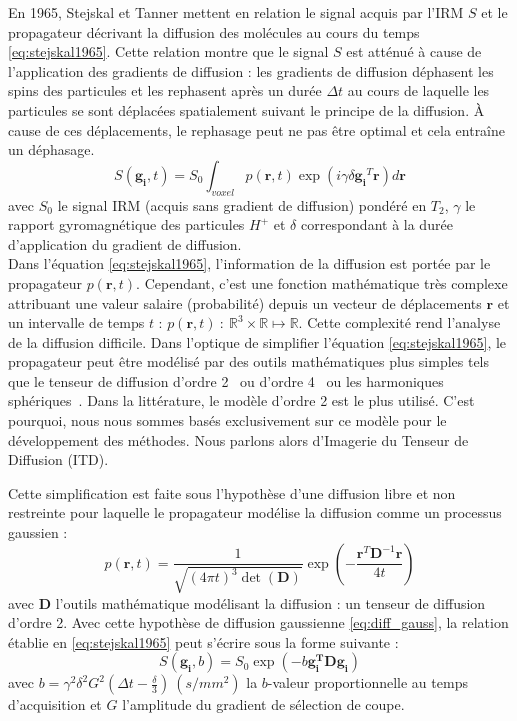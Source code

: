 En 1965, Stejskal et Tanner \cite{Stejskal1965} mettent en relation le signal acquis par l'IRM $S$
et le propagateur décrivant la diffusion des molécules au cours du temps \eqref{eq:stejskal1965}.
Cette relation montre que le signal $S$ est atténué à cause de l'application des gradients de diffusion : 
les gradients de diffusion déphasent les spins des particules et les rephasent après un durée $\Delta t$ 
au cours de laquelle les particules se sont déplacées spatialement suivant le principe de la diffusion.
À cause de ces déplacements, le rephasage peut ne pas être optimal et cela entraîne un déphasage.
\begin{equation}
    S(\mathbf{g_i},t) = S_0 \int_{voxel} p(\mathbf{r},t)\exp(i\gamma\delta\mathbf{g_i}^T\mathbf{r})d\mathbf{r}
    \label{eq:stejskal1965}
\end{equation}
\noindent avec $S_0$ le signal IRM (acquis sans gradient de diffusion) pondéré en $T_2$, $\gamma$ le rapport gyromagnétique des particules $H^+$ 
et $\delta$ correspondant à la durée d'application du gradient de diffusion.\\

Dans l'équation \eqref{eq:stejskal1965}, l'information de la diffusion est portée par le propagateur $p(\mathbf{r},t)$.
Cependant, c'est une fonction mathématique très complexe attribuant une valeur salaire (probabilité)
depuis un vecteur de déplacements $\mathbf{r}$ et un intervalle de temps $t$ : $p(\mathbf{r},t)\ :\ \mathbb{R}^3\times\mathbb{R} \mapsto \mathbb{R}$.
Cette complexité rend l'analyse de la diffusion difficile.
Dans l'optique de simplifier l'équation \eqref{eq:stejskal1965}, le propagateur peut être modélisé par des outils mathématiques plus simples
tels que le tenseur de diffusion d'ordre 2~\cite{Basser1994} ou d'ordre 4~\cite{Barmpoutis2009} ou les harmoniques sphériques~\cite{Descoteaux2007}.
Dans la littérature, le modèle d'ordre 2 est le plus utilisé.
C'est pourquoi, nous nous sommes basés exclusivement sur ce modèle pour le développement des méthodes.
Nous parlons alors d'Imagerie du Tenseur de Diffusion (ITD).

Cette simplification est faite sous l'hypothèse d'une diffusion libre et non restreinte pour laquelle
le propagateur modélise la diffusion comme un processus gaussien :
\begin{equation}
   p(\mathbf{r}, t) = \frac{1}{\sqrt{(4\pi t)^3 \det(\mathbf{D})}} \exp\left(-\frac{\mathbf{r}^T\mathbf{D}^{-1}\mathbf{r}}{4t}\right)
   \label{eq:diff_gauss}
\end{equation}
\noindent avec $\mathbf{D}$ l'outils mathématique modélisant la diffusion : un tenseur de diffusion d'ordre 2.
Avec cette hypothèse de diffusion gaussienne \eqref{eq:diff_gauss}, 
la relation établie en \eqref{eq:stejskal1965} peut s'écrire sous la forme suivante :
\begin{equation}
    S(\mathbf{g_i}, b) = S_0 \exp\left(-b\mathbf{g_i^T}\mathbf{D}\mathbf{g_i}\right)
    \label{eq:stejskal1965_gauss}
\end{equation}
\noindent avec $b=\gamma^2\delta^2G^2(\Delta t - \frac{\delta}{3})\ (s/mm^2)$ 
la $b$-valeur proportionnelle au temps d'acquisition et $G$ l'amplitude du gradient de sélection de coupe.

